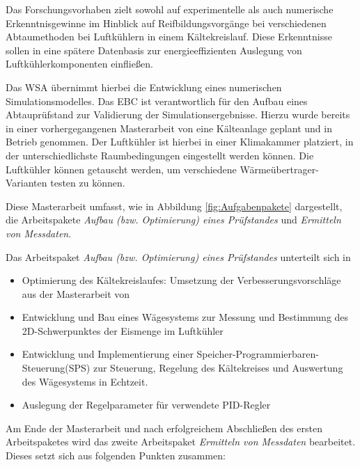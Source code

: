 Das Forschungsvorhaben zielt sowohl auf experimentelle als auch numerische Erkenntnisgewinne im Hinblick auf Reifbildungsvorgänge bei verschiedenen Abtaumethoden bei Luftkühlern in einem Kältekreislauf. Diese Erkenntnisse sollen in eine spätere Datenbasis zur energieeffizienten Auslegung von Luftkühlerkomponenten einfließen.

Das WSA übernimmt hierbei die Entwicklung eines numerischen Simulationsmodelles. Das EBC ist verantwortlich für den Aufbau eines Abtauprüfstand zur Validierung der Simulationsergebnisse. Hierzu wurde bereits in einer vorhergegangenen Masterarbeit von \textsc{\citeauthor{Helmlinger2015}} eine Kälteanlage geplant und in Betrieb genommen. Der Luftkühler ist hierbei in einer Klimakammer platziert, in der unterschiedlichste Raumbedingungen eingestellt werden können. Die Luftkühler können getauscht werden, um verschiedene Wärmeübertrager-Varianten testen zu können.



Diese Masterarbeit umfasst, wie in Abbildung \ref{fig:Aufgabenpakete} dargestellt, die Arbeitspakete \textit{Aufbau (bzw. Optimierung) eines Prüfstandes} und \textit{Ermitteln von Messdaten}.



Das Arbeitspaket \textit{Aufbau (bzw. Optimierung) eines Prüfstandes} unterteilt sich in 

\begin{itemize}

\item Optimierung des Kältekreislaufes: Umsetzung der Verbesserungsvorschläge aus der Masterarbeit von \textsc{\citeauthor{Helmlinger2015}}

\item Entwicklung und Bau eines Wägesystems zur Messung und Bestimmung des 2D-Schwerpunktes der Eismenge im Luftkühler

\item Entwicklung und Implementierung einer Speicher-Programmierbaren-Steuerung(SPS) zur Steuerung, Regelung des Kältekreises und Auswertung des Wägesystems in Echtzeit.

\item Auslegung der Regelparameter für verwendete PID-Regler
\end{itemize}

Am Ende der Masterarbeit und nach erfolgreichem Abschließen des ersten Arbeitspaketes wird das zweite Arbeitspaket \textit{Ermitteln von Messdaten} bearbeitet. Dieses setzt sich aus folgenden Punkten zusammen:

